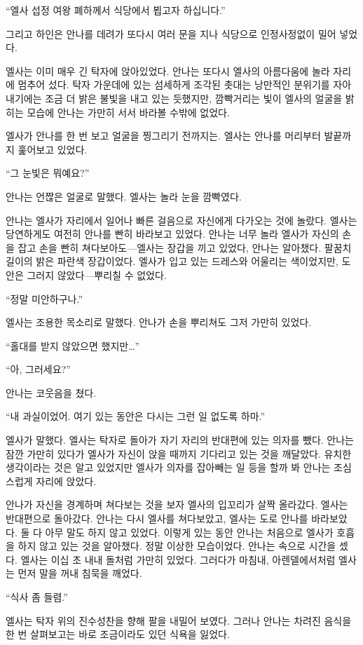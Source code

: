 ``엘사 섭정 여왕 폐하께서 식당에서 뵙고자 하십니다.''

그리고 하인은 안나를 데려가 또다시 여러 문을 지나 식당으로 인정사정없이 밀어 넣었다.

엘사는 이미 매우 긴 탁자에 앉아있었다. 안나는 또다시 엘사의 아름다움에 놀라 자리에 멈추어 섰다. 탁자 가운데에 있는 섬세하게 조각된 촛대는 낭만적인 분위기를 자아내기에는 조금 더 밝은 불빛을 내고 있는 듯했지만, 깜빡거리는 빛이 엘사의 얼굴을 밝히는 모습에 안나는 가만히 서서 바라볼 수밖에 없었다.

엘사가 안나를 한 번 보고 얼굴을 찡그리기 전까지는. 엘사는 안나를 머리부터 발끝까지 훑어보고 있었다.

``그 눈빛은 뭐예요?''

안나는 언짢은 얼굴로 말했다. 엘사는 놀라 눈을 깜빡였다.

안나는 엘사가 자리에서 일어나 빠른 걸음으로 자신에게 다가오는 것에 놀랐다. 엘사는 당연하게도 여전히 안나를 빤히 바라보고 있었다. 안나는 너무 놀라 엘사가 자신의 손을 잡고 손을 빤히 쳐다보아도—엘사는 장갑을 끼고 있었다, 안나는 알아챘다. 팔꿈치 길이의 밝은 파란색 장갑이었다. 엘사가 입고 있는 드레스와 어울리는 색이었지만, 도안은 그러지 않았다—뿌리칠 수 없었다.

``정말 미안하구나.''

엘사는 조용한 목소리로 말했다. 안나가 손을 뿌리쳐도 그저 가만히 있었다.

``홀대를 받지 않았으면 했지만\ldots''

``아, 그러세요?''

안나는 코웃음을 쳤다.

``내 과실이었어. 여기 있는 동안은 다시는 그런 일 없도록 하마.''

엘사가 말했다. 엘사는 탁자로 돌아가 자기 자리의 반대편에 있는 의자를 뺐다. 안나는 잠깐 가만히 있다가 엘사가 자신이 앉을 때까지 기다리고 있는 것을 깨달았다. 유치한 생각이라는 것은 알고 있었지만 엘사가 의자를 잡아빼는 일 등을 할까 봐 안나는 조심스럽게 자리에 앉았다.

안나가 자신을 경계하며 쳐다보는 것을 보자 엘사의 입꼬리가 살짝 올라갔다. 엘사는 반대편으로 돌아갔다. 안나는 다시 엘사를 쳐다보았고, 엘사는 도로 안나를 바라보았다. 둘 다 아무 말도 하지 않고 있었다. 이렇게 있는 동안 안나는 처음으로 엘사가 호흡을 하지 않고 있는 것을 알아챘다. 정말 이상한 모습이었다. 안나는 속으로 시간을 셌다. 엘사는 이십 초 내내 돌처럼 가만히 있었다. 그러다가 마침내, 아렌델에서처럼 엘사는 먼저 말을 꺼내 침묵을 깨었다.

``식사 좀 들렴.''

엘사는 탁자 위의 진수성찬을 향해 팔을 내밀어 보였다. 그러나 안나는 차려진 음식을 한 번 살펴보고는 바로 조금이라도 있던 식욕을 잃었다.

